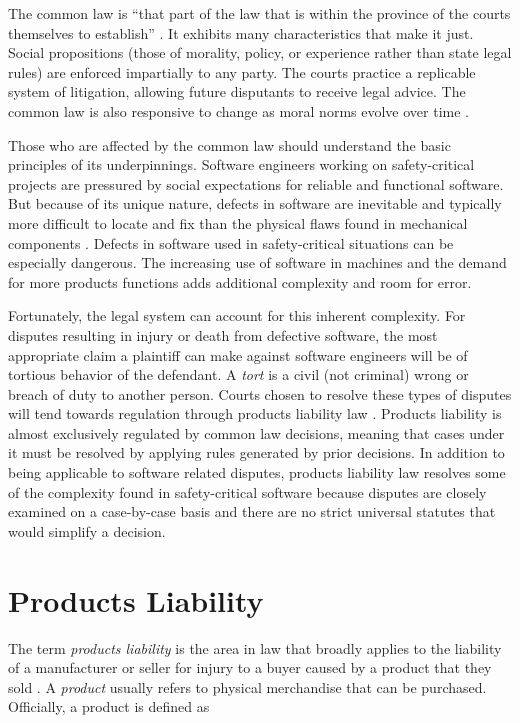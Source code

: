 \documentclass[12pt]{report}
\begin{document}
The common law is ``that part of the law that is within the province of the courts themselves to establish'' \cite{FAKE}. It exhibits many characteristics that make it just. Social propositions (those of morality, policy, or experience rather than state legal rules) are enforced impartially to any party. The courts practice a replicable system of litigation, allowing future disputants to receive legal advice. The common law is also responsive to change as moral norms evolve over time \cite{FAKE}. 

Those who are affected by the common law should understand the basic principles of its underpinnings. Software engineers working on safety-critical projects are pressured by social expectations for reliable and functional software. But because of its unique nature, defects in software are inevitable and typically more difficult to locate and fix than the physical flaws found in mechanical components \cite{Parnas90}. Defects in software used in safety-critical situations can be especially dangerous. The increasing use of software in machines and the demand for more products functions adds additional complexity and room for error.

Fortunately, the legal system can account for this inherent complexity. For disputes resulting in injury or death from defective software, the most appropriate claim a plaintiff can make against software engineers will be of tortious behavior of the defendant. A \textit{tort} is a civil (not criminal) wrong or breach of duty to another person. Courts chosen to resolve these types of disputes will tend towards regulation through products liability law \cite{FAKE}. Products liability is almost exclusively regulated by common law decisions, meaning that cases under it must be resolved by applying rules generated by prior decisions. In addition to being applicable to software related disputes, products liability law resolves some of the complexity found in safety-critical software because disputes are closely examined on a case-by-case basis and there are no strict universal statutes that would simplify a decision.

\section{Products Liability} 
The term \textit{products liability} is the area in law that broadly applies to the liability of a manufacturer or seller for injury to a buyer caused by a product that they sold \cite{FAKE}. A \textit{product} usually refers to physical merchandise that can be purchased. Officially, a product is defined as 
\end{document}
